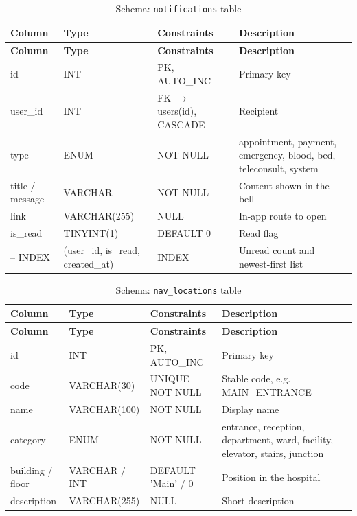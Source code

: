 \begin{longtable}{|L{3.3cm}|L{2.5cm}|L{2.4cm}|L{4.6cm}|}
\caption{Schema: \texttt{notifications} table} \label{tab:notif} \\
\hline
\textbf{Column} & \textbf{Type} & \textbf{Constraints} & \textbf{Description} \\
\hline
\endfirsthead
\hline
\textbf{Column} & \textbf{Type} & \textbf{Constraints} & \textbf{Description} \\
\hline
\endhead
\hline
\endfoot
id & INT & PK, AUTO\_INC & Primary key \\
\hline
user\_id & INT & FK $\rightarrow$ users(id), CASCADE & Recipient \\
\hline
type & ENUM & NOT NULL & appointment, payment, emergency, blood, bed, teleconsult, system \\
\hline
title / message & VARCHAR & NOT NULL & Content shown in the bell \\
\hline
link & VARCHAR(255) & NULL & In-app route to open \\
\hline
is\_read & TINYINT(1) & DEFAULT 0 & Read flag \\
\hline
-- INDEX & (user\_id, is\_read, created\_at) & INDEX & Unread count and newest-first list \\
\hline
\end{longtable}
\begin{longtable}{|L{3.3cm}|L{2.5cm}|L{2.4cm}|L{4.6cm}|}
\caption{Schema: \texttt{nav\_locations} table} \label{tab:navloc} \\
\hline
\textbf{Column} & \textbf{Type} & \textbf{Constraints} & \textbf{Description} \\
\hline
\endfirsthead
\hline
\textbf{Column} & \textbf{Type} & \textbf{Constraints} & \textbf{Description} \\
\hline
\endhead
\hline
\endfoot
id & INT & PK, AUTO\_INC & Primary key \\
\hline
code & VARCHAR(30) & UNIQUE NOT NULL & Stable code, e.g. MAIN\_ENTRANCE \\
\hline
name & VARCHAR(100) & NOT NULL & Display name \\
\hline
category & ENUM & NOT NULL & entrance, reception, department, ward, facility, elevator, stairs, junction \\
\hline
building / floor & VARCHAR / INT & DEFAULT 'Main' / 0 & Position in the hospital \\
\hline
description & VARCHAR(255) & NULL & Short description \\
\hline
\end{longtable}
